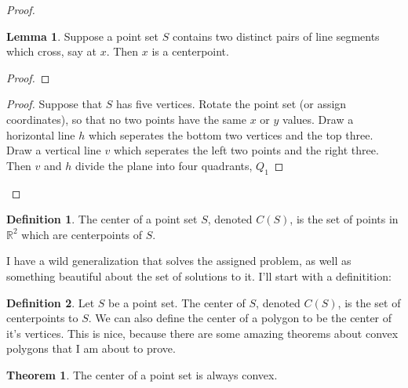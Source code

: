 \documentclass[12pt]{article}
\newcommand{\R}{\mathbb{R}}
\theoremstyle{definition}
\newtheorem*{definition}{Definition}
\newtheorem{lemma}{Lemma}
\newtheorem{theorem}{Theorem}
\begin{document}
\begin{proof}
\begin{lemma}
Suppose a point set $S$ contains two distinct pairs of line segments which cross, say at $x$. Then $x$ is a centerpoint.
\end{lemma}

\begin{proof}

\end{proof}

\begin{proof}
Suppose that $S$ has five vertices. Rotate the point set (or assign coordinates), so that no two points have the same $x$ or $y$ values. Draw a horizontal line $h$ which seperates the bottom two vertices and the top three. Draw a vertical line $v$ which seperates the left two points and the right three. Then $v$ and $h$ divide the plane into four quadrants, $Q_1$
\end{proof}


\end{proof}

\begin{definition}
The center of a point set $S$, denoted $C(S)$, is the set of points in $\R^2$ which are centerpoints of $S$. 
\end{definition}


I have a wild generalization that solves the assigned problem, as well as something beautiful about the set of solutions to it. I'll start with a definitition:

\begin{definition}
Let $S$ be a point set. The center of $S$, denoted $C(S)$, is the set of centerpoints to $S$. We can also define the center of a polygon to be the center of it's vertices. This is nice, because there are some amazing theorems about convex polygons that I am about to prove.
\end{definition}

\begin{theorem}
The center of a point set is always convex. 
\end{theorem}
\end{document}
